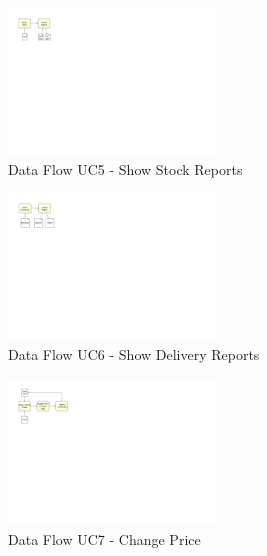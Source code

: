 \pagebreak

\begin{figure}[h!]
	\centering
	\includegraphics[width=5.5cm, trim={3cm 16cm 22cm 1cm}]{img/UC5DFD.pdf}
	\caption{Data Flow UC5 - Show Stock Reports }
	\label{fig:UC5DFD}
\end{figure}

\begin{figure}[h!]
	\centering
	\includegraphics[width=5.5cm, trim={3cm 16cm 22cm 1cm}]{img/UC6DFD.pdf}
	\caption{Data Flow UC6 - Show Delivery Reports }
	\label{fig:UC6DFD}
\end{figure}

\begin{figure}[h!]
	\centering
	\includegraphics[width=5.5cm, trim={3cm 14.5cm 22cm 1cm}]{img/UC7DFD.pdf}
	\caption{Data Flow UC7 - Change Price }
	\label{fig:UC7DFD}
\end{figure}






